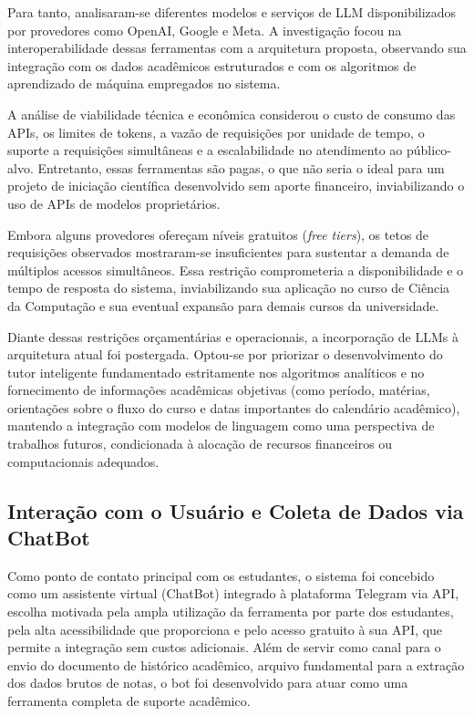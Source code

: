 Para tanto, analisaram-se diferentes modelos e serviços de LLM disponibilizados por provedores como OpenAI, Google e Meta. A investigação focou na interoperabilidade dessas ferramentas com a arquitetura proposta, observando sua integração com os dados acadêmicos estruturados e com os algoritmos de aprendizado de máquina empregados no sistema.

A análise de viabilidade técnica e econômica considerou o custo de consumo das APIs, os limites de tokens, a vazão de requisições por unidade de tempo, o suporte a requisições simultâneas e a escalabilidade no atendimento ao público-alvo. Entretanto, essas ferramentas são pagas, o que não seria o ideal para um projeto de iniciação científica desenvolvido sem aporte financeiro, inviabilizando o uso de APIs de modelos proprietários.

Embora alguns provedores ofereçam níveis gratuitos (\textit{free tiers}), os tetos de requisições observados mostraram-se insuficientes para sustentar a demanda de múltiplos acessos simultâneos. Essa restrição comprometeria a disponibilidade e o tempo de resposta do sistema, inviabilizando sua aplicação no curso de Ciência da Computação e sua eventual expansão para demais cursos da universidade.

Diante dessas restrições orçamentárias e operacionais, a incorporação de LLMs à arquitetura atual foi postergada. Optou-se por priorizar o desenvolvimento do tutor inteligente fundamentado estritamente nos algoritmos analíticos e no fornecimento de informações acadêmicas objetivas (como período, matérias, orientações sobre o fluxo do curso e datas importantes do calendário acadêmico), mantendo a integração com modelos de linguagem como uma perspectiva de trabalhos futuros, condicionada à alocação de recursos financeiros ou computacionais adequados.

\subsection{Interação com o Usuário e Coleta de Dados via ChatBot}
Como ponto de contato principal com os estudantes, o sistema foi concebido como um assistente virtual (ChatBot) integrado à plataforma Telegram via API, escolha motivada pela ampla utilização da ferramenta por parte dos estudantes, pela alta acessibilidade que proporciona e pelo acesso gratuito à sua API, que permite a integração sem custos adicionais. Além de servir como canal para o envio do documento de histórico acadêmico, arquivo fundamental para a extração dos dados brutos de notas, o bot foi desenvolvido para atuar como uma ferramenta completa de suporte acadêmico.

